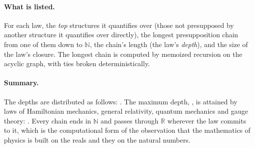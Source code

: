 \documentclass{situationist-preprint}
\begin{document}
\paragraph{What is listed.} For each law, the \emph{top} structures it quantifies over (those not presupposed by another structure it quantifies over directly), the longest presupposition chain from one of them down to $\mathbb N$, the chain's length (the law's \emph{depth}), and the size of the law's closure. The longest chain is computed by memoized recursion on the acyclic graph, with ties broken deterministically.

\paragraph{Summary.} The depths are distributed as follows: \depthDist. The maximum depth, \depthMax, is attained by laws of Hamiltonian mechanics, general relativity, quantum mechanics and gauge theory: \depthMaxLaws. Every chain ends in $\mathbb N$ and passes through $\mathbb R$ wherever the law commits to it, which is the computational form of the observation that the mathematics of physics is built on the reals and they on the natural numbers.


\end{document}

